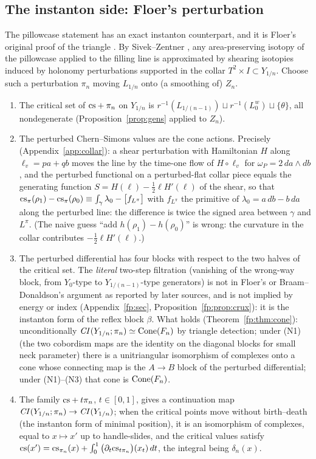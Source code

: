 \subsection{The instanton side: Floer's perturbation}
The pillowcase statement has an exact instanton counterpart, and it is Floer's original proof of the triangle
\cite{Floer,BD}.  By Sivek--Zentner \cite[Thm.~4.5]{SZ}, any area-preserving isotopy of the pillowcase applied to
the filling line is approximated by shearing isotopies induced by holonomy perturbations supported in the collar
$T^2\times I\subset Y_{1/n}$.  Choose such a perturbation $\pi_n$ moving $L_{1/n}$ onto (a smoothing of) $Z_n$.
\begin{enumerate}[label=(\roman*)]
\item The critical set of $\mathrm{cs}+\pi_n$ on $Y_{1/n}$ is $r^{-1}(L_{1/(n-1)})\sqcup r^{-1}(L^w_0)\sqcup\{\theta\}$, all
nondegenerate (Proposition~\ref{prop:gens} applied to $Z_n$).
\item The perturbed Chern--Simons values are the cone actions.  Precisely (Appendix~\ref{app:collar}): a shear
perturbation with Hamiltonian $H$ along $\ell_v=pa+qb$ moves the line by the time-one flow of $H\circ\ell_v$ for
$\omega_P=2\,da\wedge db$, and the perturbed functional on a perturbed-flat collar piece equals the generating function
$S=H(\ell)-\tfrac12\ell H'(\ell)$ of the shear, so that
$\mathrm{cs}_\pi(\rho_1)-\mathrm{cs}_\pi(\rho_0)\equiv\int_\gamma\lambda_0-\big[f_{L^\pi}\big]$ with $f_{L^\pi}$ the primitive of
$\lambda_0=a\,db-b\,da$ along the perturbed line: the difference is twice the signed area between $\gamma$ and $L^\pi$.
(The naive guess ``add $h(\rho_1)-h(\rho_0)$'' is wrong: the curvature in the collar contributes $-\tfrac12\ell H'(\ell)$.)
\item The perturbed differential has four blocks with respect to the two halves of the critical set.  The
\emph{literal} two-step filtration (vanishing of the wrong-way block, from $Y_0$-type to $Y_{1/(n-1)}$-type
generators) is not in Floer's or Braam--Donaldson's argument as reported by later sources, and is not implied by
energy or index (Appendix~\ref{fp:sec}, Proposition~\ref{fp:prop:crux}): it is the instanton form of the reflex
block $\beta$.  What holds (Theorem~\ref{fp:thm:cone}): unconditionally $\mathit{CI}(Y_{1/n};\pi_n)\simeq\operatorname{Cone}(F_n)$ by
triangle detection; under (N1) (the two cobordism maps are the identity on the diagonal blocks for small neck
parameter) there is a unitriangular isomorphism of complexes onto a cone whose connecting map is the
$A\to B$ block of the perturbed differential; under (N1)--(N3) that cone is $\operatorname{Cone}(F_n)$.
\item The family $\mathrm{cs}+t\pi_n$, $t\in[0,1]$, gives a continuation map $\mathit{CI}(Y_{1/n};\pi_n)\to\mathit{CI}(Y_{1/n})$; when the
critical points move without birth--death (the instanton form of minimal position), it is an isomorphism of
complexes, equal to $x\mapsto x'$ up to handle-slides, and the critical values satisfy
$\mathrm{cs}(x')=\mathrm{cs}_{\pi_n}(x)+\int_0^1\big(\partial_t\mathrm{cs}_{t\pi_n}\big)(x_t)\,dt$, the integral being $\delta_n(x)$.
\end{enumerate}
